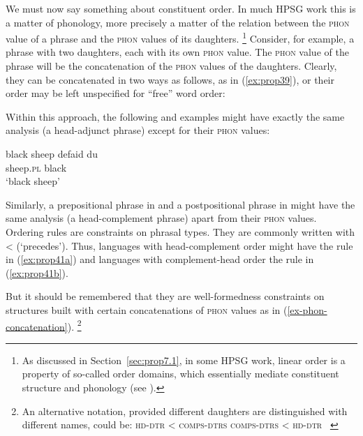 \documentclass[output=paper
	        ,collection
	        ,collectionchapter
 	        ,biblatex
                ,babelshorthands
                ,newtxmath
                ,draftmode
                ,colorlinks, citecolor=brown
]{langscibook}
\begin{document}
We must now say something about constituent order. In much HPSG work this is a matter of phonology, more precisely a matter of the relation between the \textsc{phon} value of a phrase and the \textsc{phon} values of its daughters.%
%
\footnote{As discussed in Section~\ref{sec:prop7.1}, in some HPSG work, linear order is a property of so-called order domains, which essentially mediate constituent structure and phonology (see ). }
%
Consider, for example, a phrase with two daughters, each with its own \textsc{phon} value. The \textsc{phon} value of the phrase will be the concatenation of the \textsc{phon} values of the daughters. Clearly, they can be concatenated in two ways as follows, as in (\ref{ex:prop39}), or their order may be left unspecified for ``free'' word order:

\eal
\label{ex:prop39}\label{ex-phon-concatenation}
\ex
{}
\ex
{}
\zl

Within this approach, the following  and  examples might have exactly the same analysis (a head-adjunct phrase) except for their \textsc{phon} values:

\eal\label{ex:prop40}
\ex\label{ex:prop40a}
black sheep
\ex\label{ex:prop40b}
\gll defaid            du\\
     sheep.\textsc{pl} black\\
\glt `black sheep'
\zl

Similarly, a prepositional phrase in  and a postpositional phrase in  might have the same analysis (a head-complement phrase) apart from their \textsc{phon} values. Ordering rules are constraints on phrasal types. They are commonly written with < (`precedes'). Thus, languages with head-complement order might have the rule in (\ref{ex:prop41a}) and languages with complement-head order the rule in (\ref{ex:prop41b}).

\eal\label{ex:prop41}
\ex\label{ex:prop41a}
\ex\label{ex:prop41b}
\zl
%
But it should be remembered that they are well-formedness constraints on structures built with certain concatenations of \textsc{phon} values as in (\ref{ex-phon-concatenation}).%
%
\footnote{An alternative notation, provided different daughters are distinguished with different names, could be:
\eal
\ex \textsc{hd-dtr} < \textsc{comps-dtrs}
\ex \textsc{comps-dtrs} < \textsc{hd-dtr}
\zllast
~\newline{}
}
%
\end{document}
